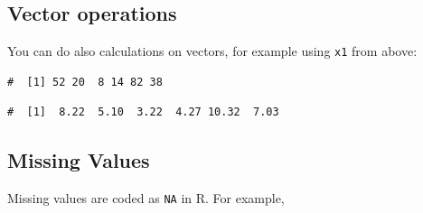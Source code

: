 \documentclass[a4paper,9pt,twocolumn,twoside,printwatermark=false]{pinp}
\begin{document}
\subsection{Vector operations}\label{vector-operations}

You can do also calculations on vectors, for example using \texttt{x1}
from above:

\begin{Shaded}
\begin{Highlighting}[]
\OperatorTok{*}\StringTok{ }
\end{Highlighting}
\end{Shaded}

\begin{ShadedResult}
\begin{verbatim}
#  [1] 52 20  8 14 82 38
\end{verbatim}
\end{ShadedResult}

\begin{Shaded}
\begin{Highlighting}[]
\NormalTok{(}\OperatorTok{*}\NormalTok{), }\NormalTok{)}
\end{Highlighting}
\end{Shaded}

\begin{ShadedResult}
\begin{verbatim}
#  [1]  8.22  5.10  3.22  4.27 10.32  7.03
\end{verbatim}
\end{ShadedResult}

\subsection{Missing Values}\label{missing-values}

Missing values are coded as \texttt{NA} in R. For example,

\begin{Shaded}
\begin{Highlighting}[]
\StringTok{ }\NormalTok{(}\NormalTok{, }\OperatorTok{-}\NormalTok{, }\NormalTok{, }\NormalTok{, }\NormalTok{, }\NormalTok{) }
\end{Highlighting}
\end{Shaded}
\end{document}
